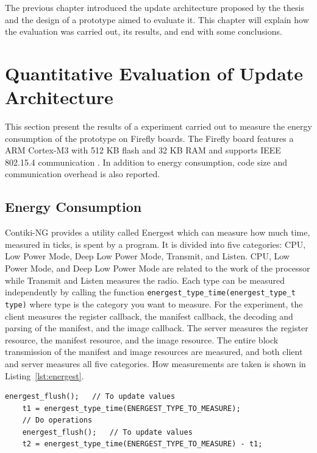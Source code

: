 \documentclass[0-thesis.tex]{subfiles}
\begin{document}
The previous chapter introduced the update architecture proposed by the thesis and the
design of a prototype aimed to evaluate it. This chapter will explain how the evaluation
was carried out, its results, and end with some conclusions.

\section{Quantitative Evaluation of Update Architecture}
\label{sec:quant-evaluation}
This section present the results of a experiment carried out to measure the energy
consumption of the prototype on Firefly boards. The Firefly board features a ARM Cortex-M3
with 512 KB flash and 32 KB RAM and supports IEEE 802.15.4 communication
\parencite{firefly-datasheet}. In addition to energy consumption, code size and
communication overhead is also reported. 

\subsection{Energy Consumption}
\label{ssec:energy-consumption}
Contiki-NG provides a utility called Energest which can measure how much time, measured in
ticks, is spent by a program. It is divided into five categories: CPU, Low Power Mode,
Deep Low Power Mode, Transmit, and Listen. CPU, Low Power Mode, and Deep Low Power Mode
are related to the work of the processor while Transmit and Listen measures the radio.
Each type can be measured independently by calling the function
\texttt{energest\_type\_time(energest\_type\_t type)} where type is the category you want
to measure. For the experiment, the client measures the register callback, the manifest
callback, the decoding and parsing of the manifest, and the image callback. The server
measures the register resource, the manifest resource, and the image resource. The entire
block transmission of the manifest and image resources are measured, and both client and
server measures all five categories. How measurements are taken is shown in
Listing~\ref{lst:energest}.

\begin{lstlisting}[language=manifest, caption={How to measure ticks in energest.}, label=lst:energest]
    energest_flush();   // To update values
    t1 = energest_type_time(ENERGEST_TYPE_TO_MEASURE);
    // Do operations
    energest_flush();   // To update values
    t2 = energest_type_time(ENERGEST_TYPE_TO_MEASURE) - t1;
\end{lstlisting}
\end{document}
